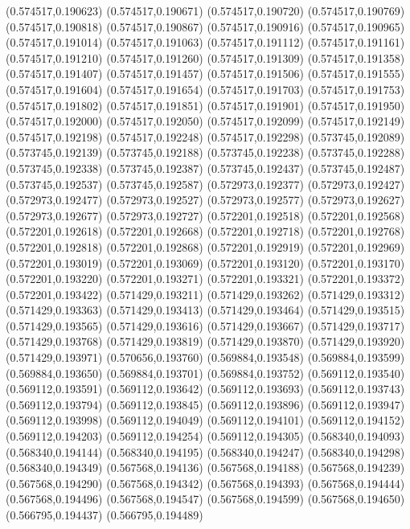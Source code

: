 (0.574517,0.190623)
(0.574517,0.190671)
(0.574517,0.190720)
(0.574517,0.190769)
(0.574517,0.190818)
(0.574517,0.190867)
(0.574517,0.190916)
(0.574517,0.190965)
(0.574517,0.191014)
(0.574517,0.191063)
(0.574517,0.191112)
(0.574517,0.191161)
(0.574517,0.191210)
(0.574517,0.191260)
(0.574517,0.191309)
(0.574517,0.191358)
(0.574517,0.191407)
(0.574517,0.191457)
(0.574517,0.191506)
(0.574517,0.191555)
(0.574517,0.191604)
(0.574517,0.191654)
(0.574517,0.191703)
(0.574517,0.191753)
(0.574517,0.191802)
(0.574517,0.191851)
(0.574517,0.191901)
(0.574517,0.191950)
(0.574517,0.192000)
(0.574517,0.192050)
(0.574517,0.192099)
(0.574517,0.192149)
(0.574517,0.192198)
(0.574517,0.192248)
(0.574517,0.192298)
(0.573745,0.192089)
(0.573745,0.192139)
(0.573745,0.192188)
(0.573745,0.192238)
(0.573745,0.192288)
(0.573745,0.192338)
(0.573745,0.192387)
(0.573745,0.192437)
(0.573745,0.192487)
(0.573745,0.192537)
(0.573745,0.192587)
(0.572973,0.192377)
(0.572973,0.192427)
(0.572973,0.192477)
(0.572973,0.192527)
(0.572973,0.192577)
(0.572973,0.192627)
(0.572973,0.192677)
(0.572973,0.192727)
(0.572201,0.192518)
(0.572201,0.192568)
(0.572201,0.192618)
(0.572201,0.192668)
(0.572201,0.192718)
(0.572201,0.192768)
(0.572201,0.192818)
(0.572201,0.192868)
(0.572201,0.192919)
(0.572201,0.192969)
(0.572201,0.193019)
(0.572201,0.193069)
(0.572201,0.193120)
(0.572201,0.193170)
(0.572201,0.193220)
(0.572201,0.193271)
(0.572201,0.193321)
(0.572201,0.193372)
(0.572201,0.193422)
(0.571429,0.193211)
(0.571429,0.193262)
(0.571429,0.193312)
(0.571429,0.193363)
(0.571429,0.193413)
(0.571429,0.193464)
(0.571429,0.193515)
(0.571429,0.193565)
(0.571429,0.193616)
(0.571429,0.193667)
(0.571429,0.193717)
(0.571429,0.193768)
(0.571429,0.193819)
(0.571429,0.193870)
(0.571429,0.193920)
(0.571429,0.193971)
(0.570656,0.193760)
(0.569884,0.193548)
(0.569884,0.193599)
(0.569884,0.193650)
(0.569884,0.193701)
(0.569884,0.193752)
(0.569112,0.193540)
(0.569112,0.193591)
(0.569112,0.193642)
(0.569112,0.193693)
(0.569112,0.193743)
(0.569112,0.193794)
(0.569112,0.193845)
(0.569112,0.193896)
(0.569112,0.193947)
(0.569112,0.193998)
(0.569112,0.194049)
(0.569112,0.194101)
(0.569112,0.194152)
(0.569112,0.194203)
(0.569112,0.194254)
(0.569112,0.194305)
(0.568340,0.194093)
(0.568340,0.194144)
(0.568340,0.194195)
(0.568340,0.194247)
(0.568340,0.194298)
(0.568340,0.194349)
(0.567568,0.194136)
(0.567568,0.194188)
(0.567568,0.194239)
(0.567568,0.194290)
(0.567568,0.194342)
(0.567568,0.194393)
(0.567568,0.194444)
(0.567568,0.194496)
(0.567568,0.194547)
(0.567568,0.194599)
(0.567568,0.194650)
(0.566795,0.194437)
(0.566795,0.194489)
